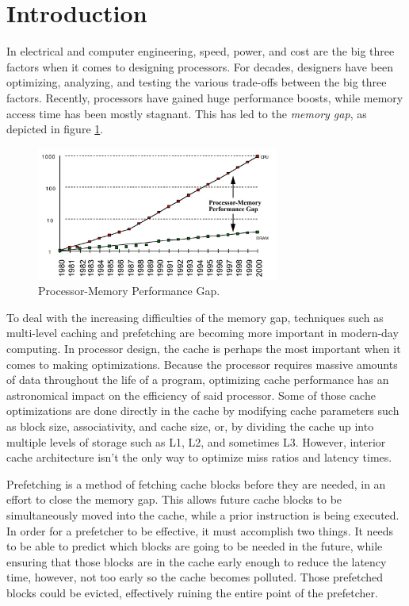\section{Introduction} \label{sec:introduction}
In electrical and computer engineering, speed, power, and cost are the big three factors when it comes to designing processors. For decades, designers have been optimizing, analyzing, and testing the various trade-offs between the big three factors. Recently, processors have gained huge performance boosts, while memory access time has been mostly stagnant. This has led to the \emph{memory gap}\cite{Book}, as depicted in figure \ref{fig:memoryGap}. 

\begin{figure}[!htb]
    \centering
    \includegraphics[width = 8cm]{images/memoryGap.jpg}
    \caption{Processor-Memory Performance Gap\cite{Book}.}
    \label{fig:memoryGap}
\end{figure}

To deal with the increasing difficulties of the memory gap, techniques such as multi-level caching and prefetching are becoming more important in modern-day computing.
In processor design, the cache is perhaps the most important when it comes to making optimizations. Because the processor requires massive amounts of data throughout the life of a program, optimizing cache performance has an astronomical impact on the efficiency of said processor. Some of those cache optimizations are done directly in the cache by modifying cache parameters such as block size, associativity, and cache size, or, by dividing the cache up into multiple levels of storage such as L1, L2, and sometimes L3. However, interior cache architecture isn't the only way to optimize miss ratios and latency times.

Prefetching\cite{Prefetch} is a method of fetching cache blocks before they are needed, in an effort to close the memory gap. This allows future cache blocks to be simultaneously moved into the cache, while a prior instruction is being executed. In order for a prefetcher to be effective, it must accomplish two things. It needs to be able to predict which blocks are going to be needed in the future, while ensuring that those blocks are in the cache early enough to reduce the latency time, however, not too early so the cache becomes polluted. Those prefetched blocks could be evicted, effectively ruining the entire point of the prefetcher.

